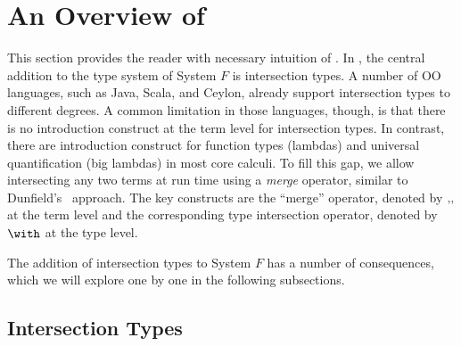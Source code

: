 \section{An Overview of \name}


This section provides the reader with necessary intuition of \name. In \name,
the central addition to the type system of System $ F $ is intersection types.
A number of OO languages, such as Java, Scala, and
Ceylon, already support intersection types to different degrees. A
common limitation in those languages, though, is that there is no introduction
construct at the term level for intersection types. In contrast, there are
introduction construct for function types (lambdas) and universal quantification
(big lambdas) in most core calculi. To fill this gap, we allow intersecting any
two terms at run time using a \emph{merge} operator, similar to
Dunfield's~\cite{dunfield2014elaborating} approach. The key constructs are the
``merge'' operator, denoted by $ ,\!, $ at the term level and the
corresponding type intersection operator, denoted by $ \intersects $ at the type
level.

The addition of intersection types to System $ F $ has a number of consequences,
which we will explore one by one in the following subsections.

\subsection{Intersection Types}


